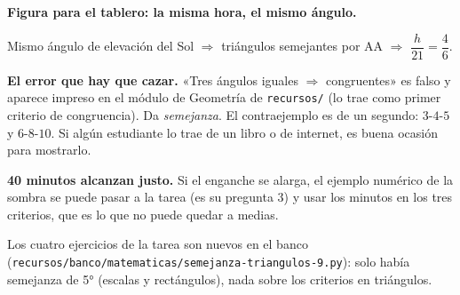 \documentclass[11pt]{article}
\begin{document}
\textbf{Figura para el tablero: la misma hora, el mismo ángulo.}

\begin{center}

{\small Mismo ángulo de elevación del Sol $\Rightarrow$ triángulos semejantes por AA
$\Rightarrow$ $\dfrac{h}{21} = \dfrac{4}{6}$.}
\end{center}

\begin{nota}
\textbf{El error que hay que cazar.} «Tres ángulos iguales $\Rightarrow$ congruentes» es falso
y aparece impreso en el módulo de Geometría de \texttt{recursos/} (lo trae como primer criterio
de congruencia). Da \emph{semejanza}. El contraejemplo es de un segundo: $3$-$4$-$5$ y
$6$-$8$-$10$. Si algún estudiante lo trae de un libro o de internet, es buena ocasión para
mostrarlo.
\end{nota}

\begin{nota}
\textbf{40 minutos alcanzan justo.} Si el enganche se alarga, el ejemplo numérico de la sombra
se puede pasar a la tarea (es su pregunta 3) y usar los minutos en los tres criterios, que es
lo que no puede quedar a medias.
\end{nota}

\begin{nota}
Los cuatro ejercicios de la tarea son nuevos en el banco
(\texttt{recursos/banco/matematicas/semejanza-triangulos-9.py}): solo había semejanza de 5°
(escalas y rectángulos), nada sobre los criterios en triángulos.
\end{nota}
\end{document}
